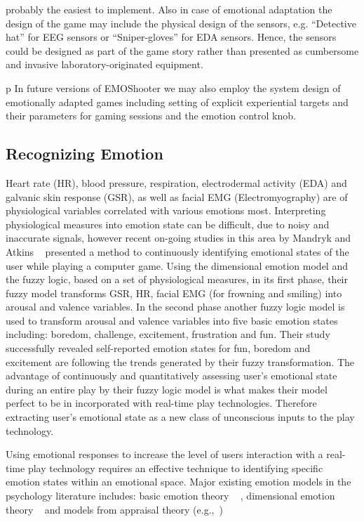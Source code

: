 probably the easiest to implement. Also in case of emotional adaptation the design of the game may include the physical design of the sensors, e.g. “Detective hat” for EEG sensors or “Sniper-gloves” for EDA sensors. Hence, the sensors could be designed as part of the game story rather than presented as cumbersome and invasive laboratory-originated equipment. 

p In future versions of EMOShooter we may also employ the system design of emotionally adapted games including setting of explicit experiential targets and their parameters for gaming sessions and the emotion control knob.


\subsection{Recognizing Emotion} %
Heart rate (HR), blood pressure, respiration, electrodermal activity (EDA) and galvanic skin response (GSR), as well as facial EMG (Electromyography) are of physiological variables correlated with various emotions most. Interpreting physiological measures into emotion state can be difficult, due to noisy and inaccurate signals, however recent on-going studies in this area by Mandryk and Atkins ~\cite{mandryk2007fuzzy} presented a method to continuously identifying emotional states of the user while playing a computer game. Using the dimensional emotion model and the fuzzy logic, based on a set of physiological measures, in its first phase, their fuzzy model transforms GSR, HR, facial EMG (for frowning and smiling) into arousal and valence variables. In the second phase another fuzzy logic model is used to transform arousal and valence variables into five basic emotion states including: boredom, challenge, excitement, frustration and fun. Their study successfully revealed self-reported emotion states for fun, boredom and excitement are following the trends generated by their fuzzy transformation. The advantage of continuously and quantitatively assessing user's emotional state during an entire play by their fuzzy logic model is what makes their model perfect to be in incorporated with real-time play technologies. Therefore extracting user's emotional state as a new class of unconscious inputs to the play technology.

Using emotional responses to increase the level of users interaction with a real-time play technology requires an effective technique to identifying specific emotion states within an emotional space. Major existing emotion models in the psychology literature includes: basic emotion theory ~\cite{ekman1992argument, ekman1992there} , dimensional emotion theory ~\cite{lang1995emotion, russell1980circumplex} and models from appraisal theory (e.g.,~\cite{roseman2001model}) ~\cite{zhang2010service}


